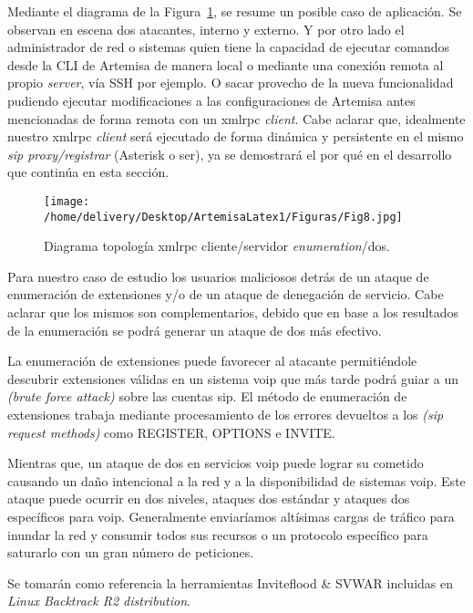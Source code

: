\documentclass[a4paper,12pt]{report}
\begin{document}
{Mediante el diagrama de la Figura~\ref{diagrama_xmlrpc_ataque}, se resume un posible caso de aplicación. Se
observan en escena dos atacantes, interno y externo. Y por otro lado el
administrador de red o sistemas quien tiene la capacidad de ejecutar
comandos desde la CLI de Artemisa de manera local o mediante una conexión
remota al propio \emph{server}, vía SSH por ejemplo. O sacar provecho de la nueva
funcionalidad pudiendo ejecutar modificaciones a las configuraciones de
Artemisa antes mencionadas de forma remota con un \ac{xmlrpc} \emph{client}. Cabe aclarar
que, idealmente nuestro \ac{xmlrpc} \emph{client} será ejecutado de forma dinámica y
persistente en el mismo \emph{\ac{sip} \mbox{proxy/registrar}} (Asterisk o \ac{ser}), ya se demostrará el
por qué en el desarrollo que continúa en esta sección.

\begin{figure}[h!] 
\centering
\texttt{[image: /home/delivery/Desktop/ArtemisaLatex1/Figuras/Fig8.jpg]}
\caption{Diagrama topología \ac{xmlrpc} cliente/servidor \emph{enumeration}/\ac{dos}.}
\label{diagrama_xmlrpc_ataque}
\end{figure} 

Para nuestro caso de estudio los usuarios maliciosos detrás de un ataque
de enumeración de extensiones y/o de un ataque de denegación de servicio. 
Cabe aclarar que los mismos son complementarios, debido que en base a los resultados de la
enumeración se podrá generar un ataque de \ac{dos} más efectivo.

La enumeración de extensiones puede favorecer al atacante
permitiéndole descubrir extensiones válidas en un sistema \ac{voip} que más
tarde podrá guiar a un \emph{(brute force attack)} sobre
las cuentas \ac{sip}. El método de enumeración de extensiones trabaja mediante
procesamiento de los errores devueltos a los \emph{(\ac{sip} request methods)}
como REGISTER, OPTIONS e INVITE. 

Mientras que, un ataque de \ac{dos} en servicios \ac{voip} puede lograr su
cometido causando
un daño intencional a la red y a la disponibilidad de sistemas \ac{voip}. Este
ataque puede ocurrir en dos niveles, ataques \ac{dos} estándar y ataques
\ac{dos} específicos para \ac{voip}. Generalmente enviaríamos altísimas cargas de
tráfico para inundar la red y consumir todos sus recursos o un protocolo
específico para saturarlo con un gran número de peticiones. 

Se tomarán como referencia la herramientas Inviteflood \&
SVWAR incluidas en \emph{Linux \mbox{Backtrack} R2 distribution}.

}
\end{document}
